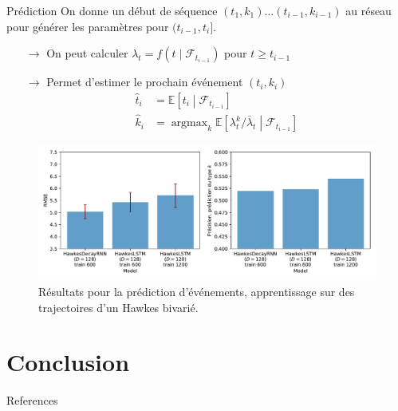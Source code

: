 \documentclass{beamer}
\newcommand{\EE}{\mathbb{E}}
\DeclareMathOperator*{\argmax}{argmax} %
\begin{document}
\begin{frame}{Prédiction}
On donne un début de séquence $(t_1,k_1)\ldots (t_{i-1}, k_{i-1})$ au réseau pour générer les paramètres pour $(t_{i-1}, t_i]$.
\begin{itemize}
	\item[$\rightarrow$] On peut calculer $\lambda_t = f(t\mid\mathcal{F}_{t_{i-1}})$ pour $t\geq t_{i-1}$
	\item[$\rightarrow$] Permet d'estimer le prochain événement $(t_i, k_i)$
	\[
	\begin{aligned}
		\hat{t}_i &= \EE\left[t_i \middle| \mathcal{F}_{t_{i-1}}\right] \\
		\hat{k}_i &= \argmax_{k}\EE\left[\lambda^k_t/\bar{\lambda}_t\middle| \mathcal{F}_{t_{i-1}} \right]
	\end{aligned}
	\]
\end{itemize}
\end{frame}

\begin{frame}
\begin{figure}
	\centering
	\includegraphics[width=\linewidth]{../results/2D_Hawkes_Data_RMSE_20181209-181315.pdf}
	\caption{Résultats pour la prédiction d'événements, apprentissage sur des trajectoires d'un Hawkes bivarié.}
\end{figure}
\end{frame}

\section{Conclusion}

\begin{frame}[t,allowframebreaks]{References}
	\printbibliography
\end{frame}
\end{document}

